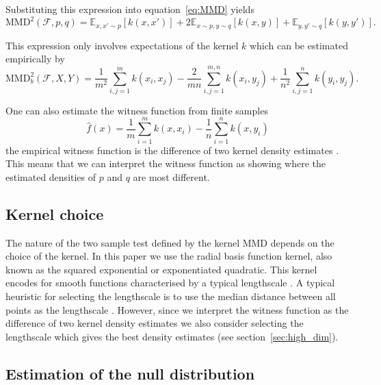 Substituting this expression into equation~\eqref{eq:MMD} yields
\begin{equation}
  \textrm{MMD}^2(\mathcal{F},p,q) = \mathbb{E}_{x,x'\sim p}[k(x,x')] + 2\mathbb{E}_{x\sim p,y\sim q}[k(x,y)] + \mathbb{E}_{y,y'\sim q}[k(y,y')].
\end{equation}

This expression only involves expectations of the kernel $k$ which can be estimated empirically by
\begin{equation}
  \textrm{MMD}_b^2(\mathcal{F},X,Y) = \frac{1}{m^2}\sum_{i,j=1}^{m}k(x_i,x_j) - \frac{2}{mn}\sum_{i,j=1}^{m,n}k(x_i,y_j) + \frac{1}{n^2}\sum_{i,j=1}^{n}k(y_i,y_j).
\label{eq:MMD_b}
\end{equation}

One can also estimate the witness function from finite samples
\begin{equation}
\hat{f}(x) = \frac{1}{m}\sum_{i=1}^{m}k(x,x_i) - \frac{1}{n}\sum_{i=1}^{n}k(x,y_i)
\label{eq:witness-estimate}
\end{equation}
\ie the empirical witness function is the difference of two kernel density estimates \citep[e.g.][]{Rosenblatt1956-hx, Parzen1962-hk}.
This means that we can interpret the witness function as showing where the estimated densities of $p$ and $q$ are most different.

\subsection{Kernel choice}

The nature of the two sample test defined by the kernel MMD depends on the choice of the kernel.
In this paper we use the radial basis function kernel, also known as the squared exponential or exponentiated quadratic.
This kernel encodes for smooth functions characterised by a typical lengthscale \citep[e.g.][]{Rasmussen2006-ml}.
A typical heuristic for selecting the lengthscale is to use the median distance between all points as the lengthscale \citep[e.g.][]{Gretton2008-gs}.
However, since we interpret the witness function as the difference of two kernel density estimates we also consider selecting the lengthscale which gives the best density estimates (see section~\ref{sec:high_dim}).

\subsection{Estimation of the null distribution}

